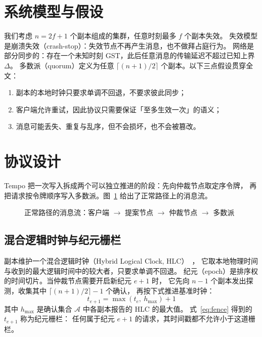 \documentclass[12pt]{ctexart}
\begin{document}
\section{系统模型与假设}\label{sec:model}
我们考虑 $n = 2f + 1$ 个副本组成的集群，任意时刻最多 $f$ 个副本失效。
失效模型是崩溃失效（crash-stop）：失效节点不再产生消息，也不做拜占庭行为。
网络是部分同步的：存在一个未知时刻 GST，此后任意消息的传输延迟不超过已知上界 $\Delta$。
多数派（quorum）定义为任意 $\lceil (n+1)/2 \rceil$ 个副本。以下三点假设贯穿全文：
\begin{enumerate}
  \item 副本的本地时钟只要求单调不回退，不要求彼此同步；
  \item 客户端允许重试，因此协议只需要保证「至多生效一次」的语义；
  \item 消息可能丢失、重复与乱序，但不会损坏，也不会被篡改。
\end{enumerate}

\section{协议设计}\label{sec:method}
Tempo 把一次写入拆成两个可以独立推进的阶段：先向仲裁节点取定序令牌，
再把请求按令牌顺序写入多数派。图~\ref{fig:flow} 给出了正常路径上的消息流。
\begin{figure}[htbp]
  \centering
  \caption{正常路径的消息流：客户端 $\to$ 提案节点 $\to$ 仲裁节点 $\to$ 多数派}\label{fig:flow}
\end{figure}

\subsection{混合逻辑时钟与纪元栅栏}\label{sec:hlc}
副本维护一个混合逻辑时钟（Hybrid Logical Clock, HLC）~\cite{lamport1978}，
它取本地物理时间与收到的最大逻辑时间中的较大者，只要求单调不回退。
纪元（epoch）是排序权的时间切片。当仲裁节点需要开启新纪元 $e+1$ 时，
它先向 $n-1$ 个副本发出探测，收集其中 $\lceil (n+1)/2 \rceil - 1$ 个确认，
再按下式推进基准时钟：
\begin{equation}\label{eq:fence}
  t_{e+1} = \max\left(t_{e},\ h_{\max}\right) + 1
\end{equation}
其中 $h_{\max}$ 是确认集合 $\mathcal{A}$ 中各副本报告的 HLC 的最大值。
式~\eqref{eq:fence} 得到的 $t_{e+1}$ 称为纪元栅栏：
任何属于纪元 $e+1$ 的请求，其时间戳都不允许小于这道栅栏。
\end{document}
